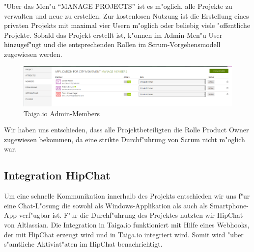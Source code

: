 \documentclass[a4paper, 11pt]{scrreprt}
\begin{document}
"Uber das Men"u "`MANAGE PROJECTS"' ist es m"oglich, alle Projekte zu verwalten und neue zu erstellen. Zur kostenlosen Nutzung ist die Erstellung eines privaten Projekts mit maximal vier Usern m"oglich oder beliebig viele "offentliche Projekte. Sobald das Projekt erstellt ist, k"onnen im Admin-Men"u User hinzugef"ugt und die entsprechenden Rollen im Scrum-Vorgehensmodell zugewiesen werden.

\begin{figure} [H]
\begin{center}


\includegraphics[width=16cm]{members.png}
\caption{Taiga.io Admin-Members}

\end{center}
\end{figure}

Wir haben uns entschieden, dass alle Projektbeteiligten die Rolle Product Owner zugewiesen bekommen, da eine strikte Durchf"uhrung von Scrum nicht m"oglich war.

\subsection{Integration HipChat}

Um eine schnelle Kommunikation innerhalb des Projekts entschieden wir uns f"ur eine Chat-L"osung die sowohl als Windows-Applikation als auch als Smartphone-App verf"ugbar ist. F"ur die Durchf"uhrung des Projektes nutzten wir HipChat von Altlassian. Die Integration in Taiga.io funktioniert mit Hilfe eines Webhooks, der mit HipChat erzeugt wird und in Taiga.io integriert wird. Somit wird "uber s"amtliche Aktiviat"aten im HipChat benachrichtigt.
\end{document}
